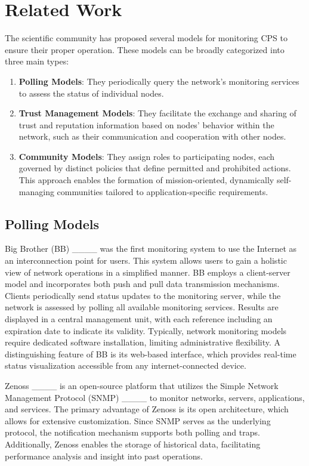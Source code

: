 \section{Related Work}
\label{Related-Work}
The scientific community has proposed several models for monitoring CPS to ensure their proper operation. These models can be broadly categorized into three main types:

\begin{enumerate}
 \item \textbf{Polling Models}: They periodically query the network's monitoring services to assess the status of individual nodes.
 \item \textbf{Trust Management Models}: They facilitate the exchange and sharing of trust and reputation information based on nodes' behavior within the network, such as their communication and cooperation with other nodes.
 \item \textbf{Community Models}: They assign roles to participating nodes, each governed by distinct policies that define permitted and prohibited actions. This approach enables the formation of mission-oriented, dynamically self-managing communities tailored to application-specific requirements.
\end{enumerate}

\subsection{Polling Models}
Big Brother (BB) ____ was the first monitoring system to use the Internet as an interconnection point for users. This system allows users to gain a holistic view of network operations in a simplified manner. BB employs a client-server model and incorporates both push and pull data transmission mechanisms. Clients periodically send status updates to the monitoring server, while the network is assessed by polling all available monitoring services. Results are displayed in a central management unit, with each reference including an expiration date to indicate its validity. Typically, network monitoring models require dedicated software installation, limiting administrative flexibility. A distinguishing feature of BB is its web-based interface, which provides real-time status visualization accessible from any internet-connected device.

Zenoss ____ is an open-source platform that utilizes the Simple Network Management Protocol (SNMP) ____ to monitor networks, servers, applications, and services. The primary advantage of Zenoss is its open architecture, which allows for extensive customization. Since SNMP serves as the underlying protocol, the notification mechanism supports both polling and traps. Additionally, Zenoss enables the storage of historical data, facilitating performance analysis and insight into past operations.

